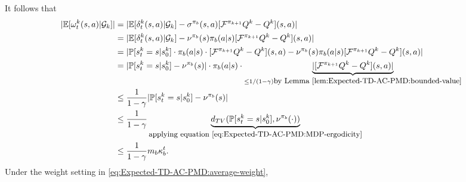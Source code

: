 \documentclass[10pt]{article}
\theoremstyle{plain}
\theoremstyle{definition}
\begin{document}
It follows that 
\begin{align*}
|\mathbb{E}[\omega_t^k(s,a)|\mathcal{G}_k]|&=|\mathbb{E}[\delta_t^k(s,a)|\mathcal{G}_k]-\sigma^{\pi_b}(s,a)[\mathcal{F}^{\pi_{k+1}}Q^k-Q^k](s,a)|\\
&=|\mathbb{E}[\delta_t^k(s,a)|\mathcal{G}_k]-\nu^{\pi_b}(s)\pi_b(a|s)[\mathcal{F}^{\pi_{k+1}}Q^k-Q^k](s,a)|\\
&=|\mathbb{P}[s_t^k=s|s_0^k]\cdot\pi_b(a|s)\cdot [\mathcal{F}^{\pi_{k+1}}Q^k-Q^k](s,a)-\nu^{\pi_b}(s)\pi_b(a|s)[\mathcal{F}^{\pi_{k+1}}Q^k-Q^k](s,a)|\\
&=|\mathbb{P}[s_t^k=s|s_0^k]-\nu^{\pi_b}(s)|\cdot\pi_b(a|s)\cdot\underbrace{|[\mathcal{F}^{\pi_{k+1}}Q^k-Q^k](s,a)|}_{\leq 1/(1-\gamma)\mbox{\small by Lemma~\ref{lem:Expected-TD-AC-PMD:bounded-value}}}\\
&\leq \frac{1}{1-\gamma}|\mathbb{P}[s_t^k=s|s_0^k]-\nu^{\pi_b}(s)|\\
&\leq \frac{1}{1-\gamma}\underbrace{d_{TV}(\mathbb{P}[s_t^k=s|s_0^k],\nu^{\pi_b}(\cdot))}_{\mbox{\small applying equation~\eqref{eq:Expected-TD-AC-PMD:MDP-ergodicity}}}\\
&\leq \frac{1}{1-\gamma}m_b\kappa_b^t.
\end{align*}
Under the weight setting in \eqref{eq:Expected-TD-AC-PMD:average-weight}, 
\end{document}
